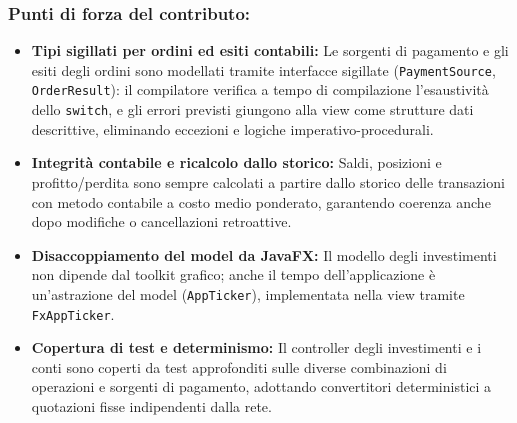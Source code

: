 \documentclass[11pt,a4paper,openright]{report}
\begin{document}
\subsubsection*{Punti di forza del contributo:}
\begin{itemize}[noitemsep,topsep=2pt]
    \item \textbf{Tipi sigillati per ordini ed esiti contabili:} Le sorgenti di pagamento e gli esiti degli ordini sono modellati tramite interfacce sigillate (\texttt{PaymentSource}, \texttt{OrderResult}): il compilatore verifica a tempo di compilazione l'esaustività dello \texttt{switch}, e gli errori previsti giungono alla view come strutture dati descrittive, eliminando eccezioni e logiche imperativo-procedurali.
    \item \textbf{Integrità contabile e ricalcolo dallo storico:} Saldi, posizioni e profitto/perdita sono sempre calcolati a partire dallo storico delle transazioni con metodo contabile a costo medio ponderato, garantendo coerenza anche dopo modifiche o cancellazioni retroattive.
    \item \textbf{Disaccoppiamento del model da JavaFX:} Il modello degli investimenti non dipende dal toolkit grafico; anche il tempo dell'applicazione è un'astrazione del model (\texttt{AppTicker}), implementata nella view tramite \texttt{FxAppTicker}.
    \item \textbf{Copertura di test e determinismo:} Il controller degli investimenti e i conti sono coperti da test approfonditi sulle diverse combinazioni di operazioni e sorgenti di pagamento, adottando convertitori deterministici a quotazioni fisse indipendenti dalla rete.
\end{itemize}
\end{document}
